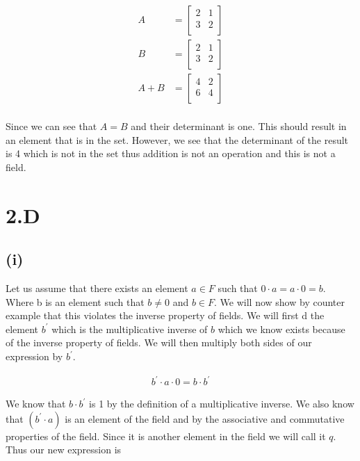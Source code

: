 \documentclass{article}
\begin{document}
    \[
        \begin{split}
            A&=
           \left[ {\begin{array}{cc}
            2 & 1 \\
            3 & 2 \\
           \end{array} } \right]\\
           B&=
           \left[ {\begin{array}{cc}
            2 & 1 \\
            3 & 2 \\
           \end{array} } \right]\\
           A + B &= 
           \left[ {\begin{array}{cc}
            4 & 2 \\
            6 & 4 \\
           \end{array} } \right]\\
        \end{split}
    \]

    Since we can see that $A = B$ and their determinant is one. This should result in an element that is in the set. However, we see that the determinant of the result is 4 which is not in the set thus addition is not an operation and this is not a field.

  \section*{2.D}
    \subsection*{(i)}
    Let us assume that there exists an element $a \in F$ such that  $0 \cdot a = a \cdot 0 = b$. Where b is an element such that $b \neq 0$ and $b \in F$. We will now show by counter example that this violates the inverse property of fields. We will first d the element $b^{\prime}$ which is the multiplicative inverse of $b$ which we know exists because of the inverse property of fields. We will then multiply both sides of our expression by $b^{\prime}$.

    \[
      \begin{split}
        b^{\prime} \cdot a \cdot 0 = b \cdot b^{\prime}
      \end{split}
    \]

    We know that $b \cdot b^{\prime}$ is 1 by the definition of a multiplicative inverse. We also know that $(b^{\prime} \cdot a)$ is an element of the field and by the associative and commutative properties of the field. Since it is another element in the field we will call it $q$. Thus our new expression is
\end{document}
